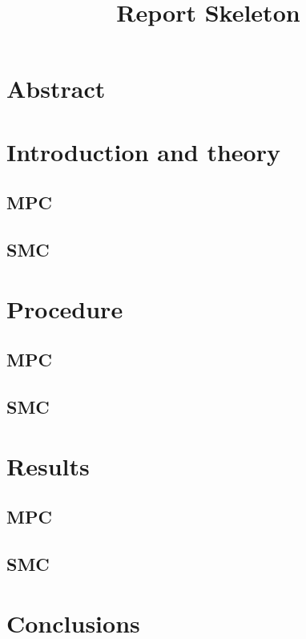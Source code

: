 \documentclass[a4paper]{article}
\title{Report Skeleton}
\begin{document}
    \maketitle

    \section{Abstract}%
    \label{sec:abstract}
    
    \section{Introduction and theory}%
    \label{sec:introduction_and_theory}
    
    \subsection{MPC}%
    \label{sub:mpc}
    
    \subsection{SMC}%
    \label{sub:smc}
    
    \section{Procedure}%
    \label{sec:procedure}

    \subsection{MPC}%
    \label{sub:mpc}
    
    \subsection{SMC}%
    \label{sub:smc}
    
    \section{Results}%
    \label{sec:results}

    \subsection{MPC}%
    \label{sub:mpc}
   
    \subsection{SMC}%
    \label{sub:smc}

    
    \section{Conclusions}%
    \label{sec:conclusions}
    
\end{document}
